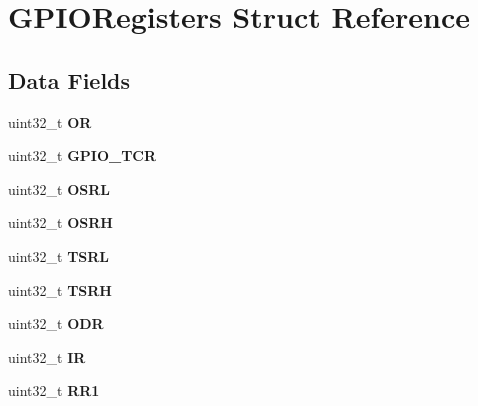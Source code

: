 \hypertarget{structGPIORegisters}{}\section{G\+P\+I\+O\+Registers Struct Reference}
\label{structGPIORegisters}
\subsection*{Data Fields}
\begin{DoxyCompactItemize}
\item 
\mbox{\label{structGPIORegisters_af07cb24e9292a6af5404a11ef98672f6}} 
uint32\+\_\+t {\bfseries OR}
\item 
\mbox{\label{structGPIORegisters_ad800f1b84b996d066c6b18d4e3c878a1}} 
uint32\+\_\+t {\bfseries G\+P\+I\+O\+\_\+\+T\+CR}
\item 
\mbox{\label{structGPIORegisters_ad5ee8e040642d783033de216f51e6e18}} 
uint32\+\_\+t {\bfseries O\+S\+RL}
\item 
\mbox{\label{structGPIORegisters_af23ec3a58b15ed8b64db8366e66e4f12}} 
uint32\+\_\+t {\bfseries O\+S\+RH}
\item 
\mbox{\label{structGPIORegisters_a6882129843edaf6987d1f2b5bf7a75de}} 
uint32\+\_\+t {\bfseries T\+S\+RL}
\item 
\mbox{\label{structGPIORegisters_a34a0e3d1cdc7f1901f18168f6bd95a90}} 
uint32\+\_\+t {\bfseries T\+S\+RH}
\item 
\mbox{\label{structGPIORegisters_ab02d680958d5fb70e979930146c23a85}} 
uint32\+\_\+t {\bfseries O\+DR}
\item 
\mbox{\label{structGPIORegisters_a5b41d4b67b6fb6ab9ee65147a0c77aa1}} 
uint32\+\_\+t {\bfseries IR}
\item 
\mbox{\label{structGPIORegisters_a3fdd07cf29e8596e7e1734f8f85aa5f6}} 
uint32\+\_\+t {\bfseries R\+R1}
\item 
\mbox{\label{structGPIORegisters_af7fb77a8282d3e912ba2ca64ed6d4464}} 

\end{DoxyCompactItemize}
